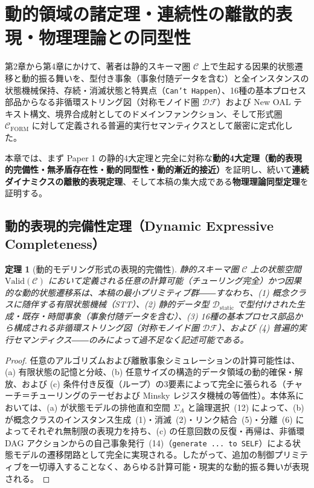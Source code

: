 \documentclass[11pt,a4paper]{ltjsarticle}
\theoremstyle{definition}
\theoremstyle{plain}
\newtheorem{theorem}{定理}[section]
\theoremstyle{remark}
\newcommand{\Valid}{\mathrm{Valid}}
\newcommand{\DF}{\mathcal{DF}}
\newcommand{\Cform}{\mathcal{C}_{\mathrm{FORM}}}
\newcommand{\Dstatic}{\mathcal{D}_{\mathrm{static}}}
\begin{document}
\section{動的領域の諸定理・連続性の離散的表現・物理理論との同型性}

第2章から第4章にかけて、著者は静的スキーマ圏 $\mathcal{C}$ 上で生起する因果的状態遷移と動的振る舞いを、型付き事象（事象付随データを含む）と全インスタンスの状態機械保持、存続・消滅状態と特異点（\texttt{Can't Happen}）、16種の基本プロセス部品からなる非循環ストリング図（対称モノイド圏 $\DF$）および New OAL テキスト構文、境界合成射としてのドメインファンクション、そして形式圏 $\Cform$ に対して定義される普遍的実行セマンティクスとして厳密に定式化した。

本章では、まず Paper 1 の静的4大定理と完全に対称な\textbf{動的4大定理（動的表現的完備性・無矛盾存在性・動的同型性・動的漸近的接近）}を証明し、続いて\textbf{連続ダイナミクスの離散的表現定理}、そして本稿の集大成である\textbf{物理理論同型定理}を証明する。

\subsection{動的表現的完備性定理（Dynamic Expressive Completeness）}

\begin{theorem}[動的モデリング形式の表現的完備性]\label{thm:dyn-comp}
静的スキーマ圏 $\mathcal{C}$ 上の状態空間 $\Valid(\mathcal{C})$ において定義される任意の計算可能（チューリング完全）かつ因果的な動的状態遷移系は、本稿の最小プリミティブ群――すなわち、(1) 概念クラスに随伴する有限状態機械（STT）、(2) 静的データ型 $\Dstatic$ で型付けされた生成・既存・時間事象（事象付随データを含む）、(3) 16種の基本プロセス部品から構成される非循環ストリング図（対称モノイド圏 $\DF$）、および (4) 普遍的実行セマンティクス――のみによって過不足なく記述可能である。
\end{theorem}

\begin{proof}
任意のアルゴリズムおよび離散事象シミュレーションの計算可能性は、(a) 有限状態の記憶と分岐、(b) 任意サイズの構造的データ領域の動的確保・解放、および (c) 条件付き反復（ループ）の3要素によって完全に張られる（チャーチ＝チューリングのテーゼおよび Minsky レジスタ機械の等価性）。本体系においては、(a) が状態モデルの排他直和空間 $\Sigma_A$ と論理選択~(12) によって、(b) が概念クラスのインスタンス生成~(1)・消滅~(2)・リンク結合~(5)・分離~(6) によってそれぞれ無制限の表現力を持ち、(c) の任意回数の反復・再帰は、非循環 DAG アクションからの自己事象発行~(14)（\texttt{generate ... to SELF}）による状態モデルの遷移閉路として完全に実現される。したがって、追加の制御プリミティブを一切導入することなく、あらゆる計算可能・現実的な動的振る舞いが表現される。
\end{proof}
\end{document}
